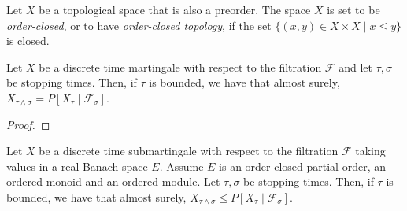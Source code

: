 \begin{definition}\label{def:orderClosedTopology}
  \mathlibok
Let $X$ be a topological space that is also a preorder. The space $X$ is set to be \emph{order-closed}, or to have \emph{order-closed topology}, if the set $\{(x, y) \in X \times X \mid x \le y\}$ is closed.
\end{definition}

\begin{lemma}\label{lem:optionalSampling_discrete}
  \mathlibok
  Let $X$ be a discrete time martingale with respect to the filtration $\mathcal{F}$ and let
  $\tau, \sigma$ be stopping times. Then, if $\tau$ is bounded, we have that almost surely,
  $X_{\tau \wedge \sigma} = P[X_{\tau} \mid \mathcal{F}_{\sigma}]$.
\end{lemma}

\begin{proof}\leanok

\end{proof}

\begin{lemma}\label{lem:optionalSampling_discrete_submartingale}
  \leanok
Let $X$ be a discrete time submartingale with respect to the filtration $\mathcal{F}$ taking values in a real Banach space $E$. Assume $E$ is an order-closed partial order, an ordered monoid and an ordered module. Let $\tau, \sigma$ be stopping times. Then, if $\tau$ is bounded, we have that almost surely, $X_{\tau \wedge \sigma} \le P[X_{\tau} \mid \mathcal{F}_{\sigma}]$.
\end{lemma}

